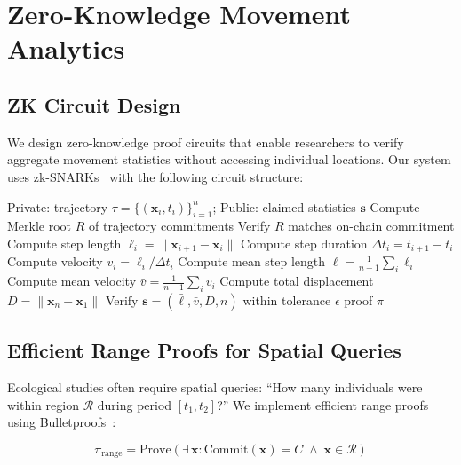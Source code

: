 \section{Zero-Knowledge Movement Analytics}


\subsection{ZK Circuit Design}

We design zero-knowledge proof circuits that enable researchers to verify aggregate movement statistics without accessing individual locations. Our system uses zk-SNARKs~\cite{groth2016} with the following circuit structure:

\begin{algorithm}[htbp]
\caption{ZK-MoveStats: Zero-Knowledge Movement Statistics}
\label{alg:zkmove}
\begin{algorithmic}[1]
\REQUIRE Private: trajectory $\tau = \{(\mathbf{x}_i, t_i)\}_{i=1}^n$; Public: claimed statistics $\mathbf{s}$
\STATE Compute Merkle root $R$ of trajectory commitments
\STATE Verify $R$ matches on-chain commitment
    \STATE Compute step length $\ell_i = \|\mathbf{x}_{i+1} - \mathbf{x}_i\|$
    \STATE Compute step duration $\Delta t_i = t_{i+1} - t_i$
    \STATE Compute velocity $v_i = \ell_i / \Delta t_i$
\ENDFOR
\STATE Compute mean step length $\bar{\ell} = \frac{1}{n-1}\sum_i \ell_i$
\STATE Compute mean velocity $\bar{v} = \frac{1}{n-1}\sum_i v_i$
\STATE Compute total displacement $D = \|\mathbf{x}_n - \mathbf{x}_1\|$
\STATE Verify $\mathbf{s} = (\bar{\ell}, \bar{v}, D, n)$ within tolerance $\epsilon$
\RETURN proof $\pi$
\end{algorithmic}
\end{algorithm}

\subsection{Efficient Range Proofs for Spatial Queries}

Ecological studies often require spatial queries: ``How many individuals were within region $\mathcal{R}$ during period $[t_1, t_2]$?'' We implement efficient range proofs using Bulletproofs~\cite{bunz2018}:

\begin{equation}
\pi_{\text{range}} = \text{Prove}\left(\exists\, \mathbf{x} : \text{Commit}(\mathbf{x}) = C \;\wedge\; \mathbf{x} \in \mathcal{R}\right)
\end{equation}

